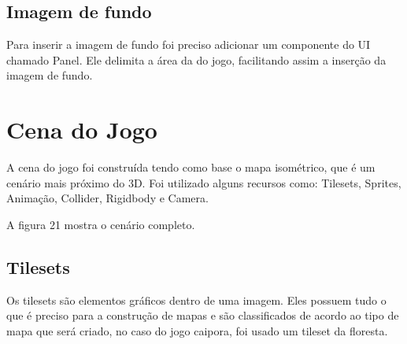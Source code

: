 \subsection{Imagem de fundo}
Para inserir a imagem de fundo foi preciso adicionar um componente do UI chamado Panel. Ele delimita a área da do jogo, facilitando assim a inserção da imagem de fundo.

\section{Cena do Jogo}
A cena do jogo foi construída tendo como base o mapa isométrico, que é um cenário mais próximo do 3D. Foi utilizado alguns recursos como: Tilesets, Sprites, Animação, Collider, Rigidbody e Camera.

A figura 21 mostra o cenário completo.

\begin{figure}[h!]
		\centering
	\end{figure}

\subsection{Tilesets}
Os tilesets são elementos gráficos dentro de uma imagem. Eles possuem tudo o que é preciso para a construção de mapas e são classificados de acordo ao tipo de mapa que será criado, no caso do jogo caipora, foi usado um tileset da floresta.

